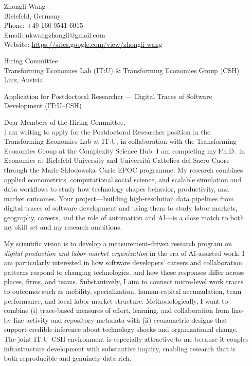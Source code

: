 \documentclass[11pt]{article}
\begin{document}
\noindent
Zhongli Wang \\
Bielefeld, Germany \\
Phone: +49 160 9541 6015 \\
Email: nkwangzhongli@gmail.com \\
Website: \href{https://sites.google.com/view/zhongli-wang}{https://sites.google.com/view/zhongli-wang}

\vspace{0.45cm}

\noindent
Hiring Committee \\
Transforming Economies Lab (IT:U) \& Transforming Economies Group (CSH) \\
Linz, Austria

\vspace{0.45cm}

\noindent
Application for Postdoctoral Researcher --- Digital Traces of Software Development (IT:U--CSH)

\vspace{0.35cm}

\noindent Dear Members of the Hiring Committee,\\[0.2cm]

I am writing to apply for the Postdoctoral Researcher position in the Transforming Economies Lab at IT:U, in collaboration with the Transforming Economies Group at the Complexity Science Hub. I am completing my Ph.D.\ in Economics at Bielefeld University and Universit\`a Cattolica del Sacro Cuore through the Marie Sk{\l}odowska--Curie EPOC programme. My research combines applied econometrics, computational social science, and scalable simulation and data workflows to study how technology shapes behavior, productivity, and market outcomes. 
Your project---building high-resolution data pipelines from digital traces of software development and using them to study labor markets, geography, careers, and the role of automation and AI---is a close match to both my skill set and my research ambitions.

My scientific vision is to develop a measurement-driven research program on \emph{digital production and labor-market organization} in the era of AI-assisted work. 
I am particularly interested in how software developers' careers and collaboration patterns respond to changing technologies, and how these responses differ across places, firms, and teams. Substantively, I aim to connect micro-level work traces to outcomes such as mobility, specialization, human-capital accumulation, team performance, and local labor-market structure. Methodologically, I want to combine (i) trace-based measures of effort, learning, and collaboration from line-by-line activity and repository metadata with (ii) econometric designs that support credible inference about technology shocks and organizational change. The joint IT:U--CSH environment is especially attractive to me because it couples infrastructure development with substantive inquiry, enabling research that is both reproducible and genuinely data-rich.
\end{document}
